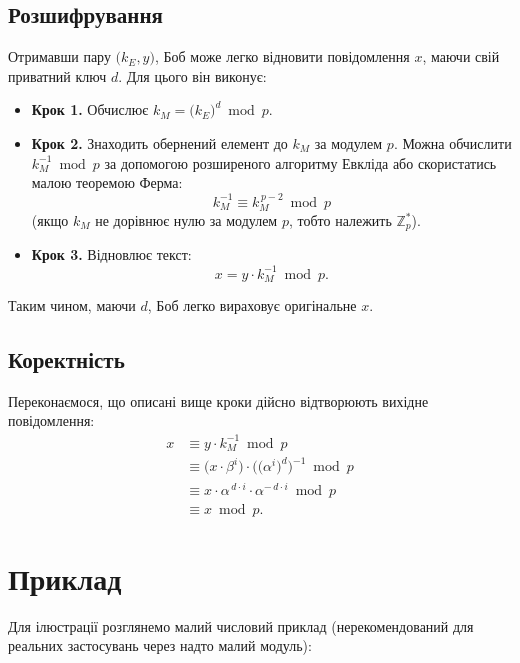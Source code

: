 \documentclass[12pt]{report}
\theoremstyle{definition}
\theoremstyle{plain}
\begin{document}
\subsection{Розшифрування}

Отримавши пару \(\bigl(k_E, y\bigr)\), Боб може легко відновити повідомлення \(x\), маючи свій приватний ключ \(d\). Для цього він виконує:

\begin{itemize}
    \item \textbf{Крок 1.} Обчислює 
          \(\displaystyle k_M = \bigl(k_E\bigr)^d \bmod p\).
    \item \textbf{Крок 2.} Знаходить обернений елемент до \(k_M\) за модулем \(p\). Можна обчислити \(k_M^{-1} \bmod p\) за допомогою розширеного алгоритму Евкліда або скористатись малою теоремою Ферма:
          \[
             k_M^{-1} \equiv k_M^{\,p-2} \bmod p 
          \]
          (якщо \(k_M\) не дорівнює нулю за модулем \(p\), тобто належить \(\mathbb{Z}_p^*\)).
    \item \textbf{Крок 3.} Відновлює текст:
          \[
             x = y \cdot k_M^{-1} \bmod p.
          \]
\end{itemize}

Таким чином, маючи \(d\), Боб легко вираховує оригінальне \(x\).

\subsection{Коректність}

Переконаємося, що описані вище кроки дійсно відтворюють вихідне повідомлення:
\[
\begin{aligned}
x &\equiv y \cdot k_M^{-1} \bmod p \\
  &\equiv \bigl(x \cdot \beta^i\bigr) \cdot \bigl(\bigl(\alpha^i\bigr)^d\bigr)^{-1} \bmod p \\
  &\equiv x \cdot \alpha^{\,d\cdot i} \cdot \alpha^{-\,d\cdot i} \bmod p \\
  &\equiv x \bmod p.
\end{aligned}
\]

\section{Приклад}

Для ілюстрації розглянемо малий числовий приклад (нерекомендований для реальних застосувань через надто малий модуль):
\end{document}
